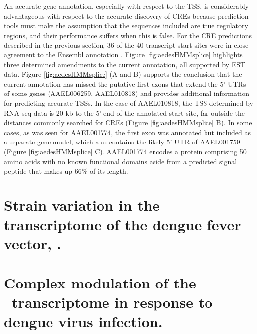 An accurate gene annotation, especially with respect to the \gls{TSS}, is considerably advantageous with respect to the accurate discovery of \glspl{CRE} because prediction tools must make the assumption that the sequences included are true regulatory regions, and their performance suffers when this is false. For the \gls{CRE} predictions described in the previous section, 36 of the 40 transcript start sites were in close agreement to the Ensembl annotation \cite{Hubbard2002}. Figure \ref{fig:aedesHMMsplice} highlights three determined amendments to the current annotation, all supported by EST data. Figure \ref{fig:aedesHMMsplice} (A and B) supports the conclusion that the current annotation has missed the putative first exons that extend the 5'-UTRs of some genes (AAEL006259, AAEL010818) and provides additional information for predicting accurate \glspl{TSS}. In the case of AAEL010818, the \gls{TSS} determined by RNA-seq data is 20 kb to the 5'-end of the annotated start site, far outside the distances commonly searched for \glspl{CRE} (Figure \ref{fig:aedesHMMsplice} B). In some cases, as was seen for AAEL001774, the first exon was annotated but included as a separate gene model, which also contains the likely 5'-UTR of AAEL001759 (Figure \ref{fig:aedesHMMsplice} C). AAEL001774 encodes a protein comprising 50 amino acids with no known functional domains aside from a predicted signal peptide that makes up 66\% of its length.






\pagebreak
\section{Strain variation in the transcriptome of the dengue fever vector, \Aea. \cite{bonizzoni2012strain}}







\pagebreak
\section{Complex modulation of the \Aea\ transcriptome in response to dengue virus infection. \cite{bonizzoni2012complex}}







